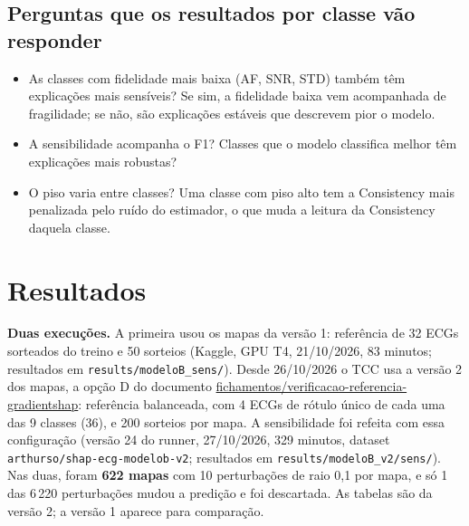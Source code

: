 \documentclass[11pt,a4paper]{article}
\begin{document}
\subsection{Perguntas que os resultados por classe vão responder}
\begin{itemize}
\item As classes com fidelidade mais baixa (AF, SNR, STD) também têm explicações mais sensíveis? Se sim, a fidelidade baixa vem acompanhada de fragilidade; se não, são explicações estáveis que descrevem pior o modelo.
\item A sensibilidade acompanha o F1? Classes que o modelo classifica melhor têm explicações mais robustas?
\item O piso varia entre classes? Uma classe com piso alto tem a Consistency mais penalizada pelo ruído do estimador, o que muda a leitura da Consistency daquela classe.
\end{itemize}

\section{Resultados}
\def\UrlBreaks{\do\/\do-}\sloppy
\textbf{Duas execuções.} A primeira usou os mapas da versão 1: referência de 32 ECGs sorteados do treino e 50 sorteios (Kaggle, GPU T4, 21/10/2026, 83 minutos; resultados em \texttt{results/modeloB\_sens/}). Desde 26/10/2026 o TCC usa a versão 2 dos mapas, a opção D do documento \url{fichamentos/verificacao-referencia-gradientshap}: referência balanceada, com 4 ECGs de rótulo único de cada uma das 9 classes (36), e 200 sorteios por mapa. A sensibilidade foi refeita com essa configuração (versão 24 do runner, 27/10/2026, 329 minutos, dataset \texttt{arthurso/shap-ecg-modelob-v2}; resultados em \texttt{results/modeloB\_v2/sens/}). Nas duas, foram \textbf{622 mapas} com 10 perturbações de raio 0,1 por mapa, e só 1 das 6\,220 perturbações mudou a predição e foi descartada. As tabelas são da versão 2; a versão 1 aparece para comparação.
\end{document}
